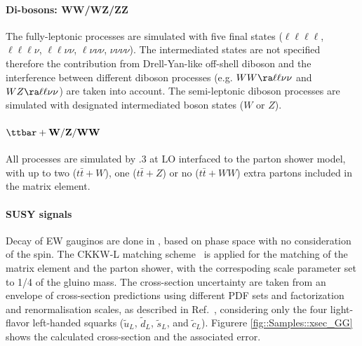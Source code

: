 \paragraph{Di-bosons: WW/WZ/ZZ}
The fully-leptonic processes are simulated with five final states ($\ell\ell\ell\ell$, $\ell\ell\ell\nu$, $\ell\ell\nu\nu$, $\ell\nu\nu\nu$, $\nu\nu\nu\nu$). The intermediated states are not specified therefore the contribution from Drell-Yan-like off-shell diboson and the interference between different diboson processes (e.g. $WW\ra\ell\ell\nu\nu$ and $WZ\ra\ell\ell\nu\nu$) are taken into account. The semi-leptonic diboson processes are simulated with designated intermediated boson states ($W$ or $Z$). \\


\paragraph{${\bf \ttbar+W/Z/WW}$}
All processes are simulated by .3 at LO interfaced to the  parton shower model, 
with up to two ($t\bar{t}+W$), one ($t\bar{t}+Z$) or no ($t\bar{t}+WW$) extra partons included in the matrix element.  \\


\paragraph{SUSY signals} \label{sec::Samples::SUSY}
Decay of EW gauginos are done in \pythia , based on phase space with no consideration of the spin.
The CKKW-L matching scheme~\cite{CKKW} is applied for the matching of the matrix element and the parton shower, with the correspoding scale parameter set to 1/4 of the gluino mass. 
The cross-section uncertainty are taken from an envelope of cross-section predictions using different PDF sets and factorization and renormalisation scales, as described in Ref.~\cite{Borschensky:2014cia}, considering only the four light-flavor left-handed squarks ($\tilde{u}_L$, $\tilde{d}_L$, $\tilde{s}_L$, and $\tilde{c}_L$). Figurere \ref{fig::Samples::xsec_GG} shows the calculated cross-section and the associated error. \\

